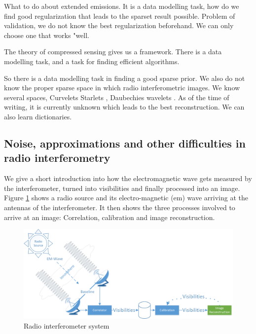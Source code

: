 What to do about extended emissions. It is a data modelling task, how do we find good regularization that leads to the sparset result possible. Problem of validation, we do not know the best regularization beforehand. We can only choose one that works "well.

The theory of compressed sensing gives us a framework. There is a data modelling task, and a task for finding efficient algorithms.

So there is a data modelling task in finding a good sparse prior.
We also do not know the proper sparse space in which radio interferometric images. We know several spaces, Curvelets \cite{starck2003astronomical} Starlets \cite{starck2015starlet}, Daubechies wavelets \cite{carrillo2012sparsity}. As of the time of writing, it is currently unknown which leads to the best reconstruction.
We can also learn dictionaries.




\subsection{Noise, approximations and other difficulties in radio interferometry}
We give a short introduction into how the electromagnetic wave gets measured by the interferometer, turned into visibilities and finally processed into an image. Figure \ref{intro:system} shows a radio source and its electro-magnetic (em) wave arriving at the antennas of the interferometer. It then shows the three processes involved to arrive at an image: Correlation, calibration and image reconstruction.
	
\begin{figure}[h]
	\centering
	\includegraphics[width=0.80\linewidth]{./chapters/01.intro/system.png}
	\caption{Radio interferometer system}
	\label{intro:system}
\end{figure}

